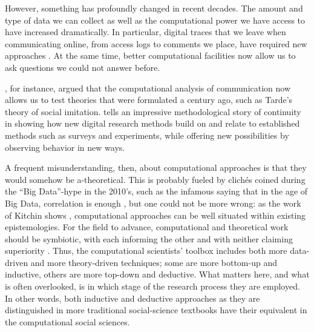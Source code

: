 However, something has profoundly changed in recent decades. The amount
and type of data we can collect as well as the computational power we
have access to have increased dramatically. In particular, digital
traces that we leave when communicating online, from access logs to
comments we place, have required new approaches \citep[e.g.,][]{Trilling2017b}. At the same time, better computational
facilities now allow us to ask questions we could not answer before.

\citet{Gonzalez-Bailon2017}, for instance, argued that the
computational analysis of communication now allows us to test theories
that were formulated a century ago, such as Tarde's theory of
social imitation. \citet{Salganik2019} tells an impressive
methodological story of continuity in showing how new digital
research methods build on and relate to established methods such as
surveys and experiments, while offering new possibilities by observing
behavior in new ways.

A frequent misunderstanding, then, about computational approaches is
that they would somehow be a-theoretical. This is probably fueled by
clich\'{e}s coined during the ``Big Data''-hype in the 2010's, such as the
infamous saying that in the age of Big Data, correlation is enough \citep{Mayer2013},
but one could not be more wrong: as the work of Kitchin shows \citep{Kitchin2014,Kitchin2014data}, computational approaches can
be well situated within existing epistemologies.
For the field to advance, computational and theoretical work should be symbiotic, with each informing the other
and with neither claiming superiority \cite{margolin19}.
Thus, the computational
scientists' toolbox includes both more data-driven and more
theory-driven techniques; some are more bottom-up and inductive,
others are more top-down and deductive. What matters here, and what is
often overlooked, is in which stage of the research process they are
employed. In other words, both inductive and deductive approaches as
they are distinguished in more traditional social-science textbooks
\citep[e.g.,][]{Bryman2012} have their equivalent in the computational
social sciences.

